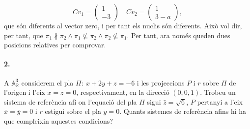 \documentclass[11pt]{article}
\newcommand{\af}{\mathbb{A}}
\begin{document}
$$
Cv_1=\begin{pmatrix}
1\\ -3
\end{pmatrix}\quad Cv_2=\begin{pmatrix}
1\\
3-a
\end{pmatrix},
$$
que són diferents al vector zero, i per tant els nuclis són diferents. Això vol dir, per tant, que $\pi_1\nparallel\pi_2\wedge\pi_1\not\subseteq\pi_2\wedge\pi_2\not\subseteq\pi_1$. Per tant, ara només queden dues posicions relatives per comprovar.












\newpage





\paragraph{2.}	A $\af^3_{\mathbb{R}}$ considerem el pla $\Pi:\ x + 2y + z = -6$ i les projeccions $P$ i $r$ sobre $\Pi$ de l'origen i l'eix ${x = z = 0}$, respectivament, en la direcció $(0, 0, 1)$. Trobeu un sistema de referència afí on l'equació del
pla $\Pi$ sigui $\bar{z}=\sqrt{6}$, $P$ pertanyi a l'eix ${\bar{x} = \bar{y} = 0}$ i $r$ estigui sobre el pla $y = 0$. Quants sistemes de referència afins hi ha que compleixin aquestes condicions?
\end{document}
